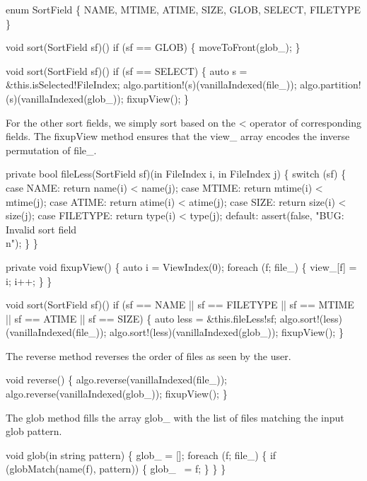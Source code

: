 enum SortField
\{
  NAME,
  MTIME,
  ATIME,
  SIZE,
  GLOB,
  SELECT,
  FILETYPE
\}

void sort(SortField sf)()
  if (sf == GLOB)
\{
  moveToFront(glob_);
\}

void sort(SortField sf)()
  if (sf == SELECT)
\{
  auto s = &this.isSelected!FileIndex;
  algo.partition!(s)(vanillaIndexed(file_));
  algo.partition!(s)(vanillaIndexed(glob_));
  fixupView();
\}

\nwendcode{}For the other sort fields, we simply sort based on the {\Tt{}<\nwendquote}
operator of corresponding fields. The {\Tt{}fixupView\nwendquote} method ensures
that the {\Tt{}view{\_}\nwendquote} array encodes the inverse permutation of
{\Tt{}file{\_}\nwendquote}.

\nwenddocs{}\plusendmoddef\nwstartdeflinemarkup\nwenddeflinemarkup
private bool fileLess(SortField sf)(in FileIndex i, in FileIndex j)
\{
  switch (sf) \{
    case NAME:     return name(i)  < name(j);
    case MTIME:    return mtime(i) < mtime(j);
    case ATIME:    return atime(i) < atime(j);
    case SIZE:     return size(i)  < size(j);
    case FILETYPE: return type(i)  < type(j);
    default: assert(false, "BUG: Invalid sort field\\n");
  \}
\}

private void fixupView()
\{
  auto i = ViewIndex(0);
  foreach (f; file_) \{
    view_[f] = i;
    i++;
  \}
\}

void sort(SortField sf)()
  if (sf == NAME     ||
      sf == FILETYPE ||
      sf == MTIME    ||
      sf == ATIME    ||
      sf == SIZE)
\{
  auto less   = &this.fileLess!sf;
  algo.sort!(less)(vanillaIndexed(file_));
  algo.sort!(less)(vanillaIndexed(glob_));
  fixupView();
\}

\nwendcode{}The {\Tt{}reverse\nwendquote} method reverses the order of files as seen by the
user.

\nwenddocs{}\plusendmoddef\nwstartdeflinemarkup\nwenddeflinemarkup
void reverse()
\{
  algo.reverse(vanillaIndexed(file_));
  algo.reverse(vanillaIndexed(glob_));
  fixupView();
\}

\nwendcode{}The {\Tt{}glob\nwendquote} method fills the array {\Tt{}glob{\_}\nwendquote} with the list of files
matching the input glob pattern.

\nwenddocs{}\plusendmoddef\nwstartdeflinemarkup\nwenddeflinemarkup
void glob(in string pattern)
\{
  glob_ = [];
  foreach (f; file_) \{
    if (globMatch(name(f), pattern)) \{
      glob_ ~= f;
    \}
  \}
\}

